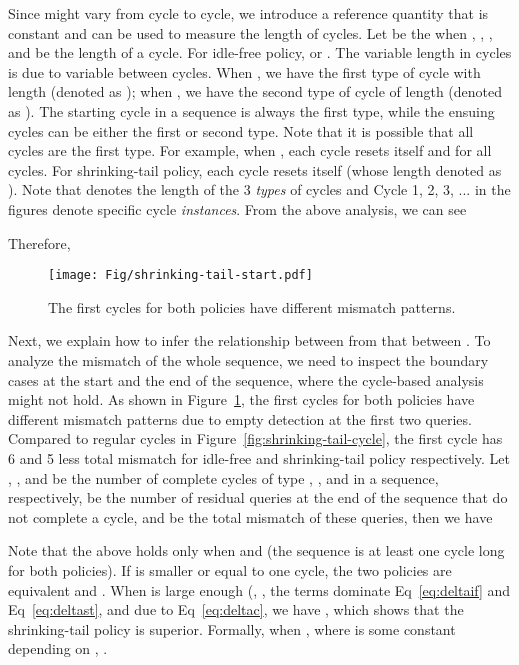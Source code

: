 Since  might vary from cycle to cycle, we introduce a reference quantity that is constant and can be used to measure the length of cycles.
Let  be the  when , \ie, , and  be the length of a cycle. For idle-free policy,  or . The variable length in cycles is due to variable  between cycles. When , we have the first type of cycle with length  (denoted as ); when , we have the second type of cycle of length  (denoted as ). The starting cycle in a sequence is always the first type, while the ensuing cycles can be either the first or second type. Note that it is possible that all cycles are the first type. For example, when , each cycle resets itself and  for all cycles. For shrinking-tail policy, each cycle resets itself (whose length denoted as ). Note that  denotes the length of the 3 {\em types} of cycles and Cycle 1, 2, 3, ... in the figures denote specific cycle {\em instances}.
From the above analysis, we can see

Therefore,


\begin{figure}[!b]
\centering
\texttt{[image: Fig/shrinking-tail-start.pdf]}

\caption{The first cycles for both policies have different mismatch patterns.
}
\label{fig:schedule-starting}
\end{figure}

Next, we explain how to infer the relationship between  from that between . To analyze the mismatch of the whole sequence, we need to inspect the boundary cases at the start and the end of the sequence, where the cycle-based analysis might not hold. As shown in Figure~\ref{fig:schedule-starting}, the first cycles for both policies have different mismatch patterns due to empty detection at the first two queries. Compared to regular cycles in Figure~\ref{fig:shrinking-tail-cycle}, the first cycle has 6 and 5 less total mismatch for idle-free and shrinking-tail policy respectively. Let , , and  be the number of complete cycles of type , , and  in a sequence, respectively,  be the number of residual queries at the end of the sequence that do not complete a cycle, and  be the total mismatch of these  queries, then we have

Note that the above holds only when  and  (the sequence is at least one cycle long for both policies). If  is smaller or equal to one cycle, the two policies are equivalent and . When  is large enough (\eg, , the  terms dominate Eq~\ref{eq:deltaif} and Eq~\ref{eq:deltast}, and due to Eq~\ref{eq:deltac}, we have , which shows that the shrinking-tail policy is superior.
Formally, when , where  is some constant depending on , .

